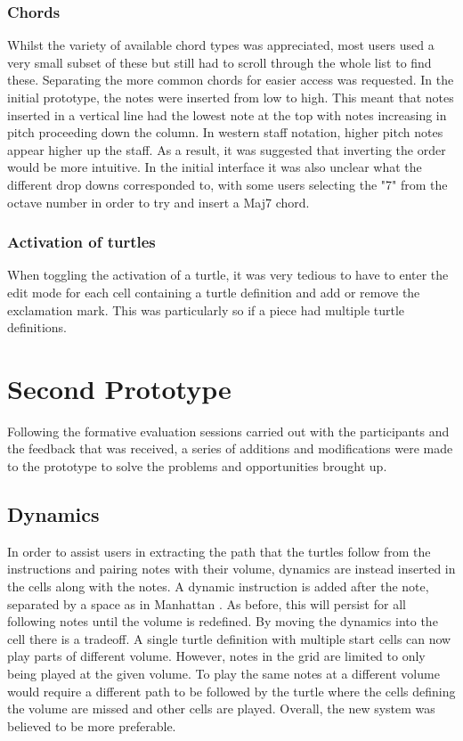 \subsubsection{Chords}

Whilst the variety of available chord types was appreciated, most users used a very small subset of these but still had to scroll through the whole list to find these. Separating the more common chords for easier access was requested. In the initial prototype, the notes were inserted from low to high. This meant that notes inserted in a vertical line had the lowest note at the top with notes increasing in pitch proceeding down the column. In western staff notation, higher pitch notes appear higher up the staff. As a result, it was suggested that inverting the order would be more intuitive. In the initial interface it was also unclear what the different drop downs corresponded to, with some users selecting the "7" from the octave number in order to try and insert a Maj7 chord.

\subsubsection{Activation of turtles}

When toggling the activation of a turtle, it was very tedious to have to enter the edit mode for each cell containing a turtle definition and add or remove the exclamation mark. This was particularly so if a piece had multiple turtle definitions.

\section{Second Prototype}

Following the formative evaluation sessions carried out with the participants and the feedback that was received, a series of additions and modifications were made to the prototype to solve the problems and opportunities brought up.

\subsection{Dynamics}

In order to assist users in extracting the path that the turtles follow from the instructions and pairing notes with their volume, dynamics are instead inserted in the cells along with the notes. A dynamic instruction is added after the note, separated by a space as in Manhattan \cite{nash:manhattan}. As before, this will persist for all following notes until the volume is redefined. By moving the dynamics into the cell there is a tradeoff. A single turtle definition with multiple start cells can now play parts of different volume. However, notes in the grid are limited to only being played at the given volume. To play the same notes at a different volume would require a different path to be followed by the turtle where the cells defining the volume are missed and other cells are played. Overall, the new system was believed to be more preferable.


